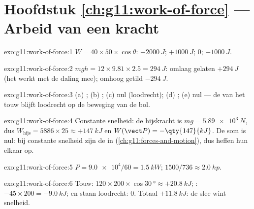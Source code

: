 \section*{Hoofdstuk \ref{ch:g11:work-of-force} --- Arbeid van een kracht}

\begin{solution}{exo:g11:work-of-force:1}
$W = 40 \times 50 \times \cos\theta$: $+\qty{2000}{J}$;
$+\qty{1000}{J}$; $0$; $-\qty{1000}{J}$.
\end{solution}

\begin{solution}{exo:g11:work-of-force:2}
$mgh = 12 \times 9.81 \times 2.5 = \qty{294}{J}$: omlaag gelaten
$+\qty{294}{J}$ (het  werkt met de daling mee); omhoog getild
$-\qty{294}{J}$.
\end{solution}

\begin{solution}{exo:g11:work-of-force:3}
(a) ; (b) ; (c) nul (loodrecht); (d) ; (e) nul ---
de  van het touw blijft loodrecht op de beweging van de bol.
\end{solution}

\begin{solution}{exo:g11:work-of-force:4}
Constante snelheid: de hijskracht is $mg = \qty{5.89e3}{N}$, dus
$W_{\text{hijs}} = 5886 \times 25 \approx +\qty{147}{kJ}$ en
$W(\vect P) = -\qty{147}{kJ}$. De som is nul: bij constante snelheid zijn
de  in  (\cref{ch:g11:forces-and-motion}), dus heffen
hun  elkaar op.
\end{solution}

\begin{solution}{exo:g11:work-of-force:5}
$P = \num{9.0e4}/60 = \qty{1.5}{kW}$; $1500/736 \approx \qty{2.0}{hp}$.
\end{solution}

\begin{solution}{exo:g11:work-of-force:6}
Touw: $120 \times 200 \times \cos\qty{30}{\degree} \approx
+\qty{20.8}{kJ}$; : $-45 \times 200 = -\qty{9.0}{kJ}$;  en
 staan loodrecht: $0$. Totaal $+\qty{11.8}{kJ}$: de slee
wint snelheid.
\end{solution}

